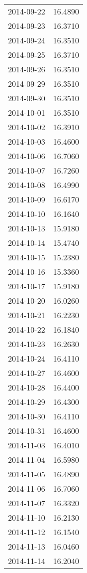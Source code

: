 \begin{tabular}{lr}
2014-09-22 &     16.4890 \\
2014-09-23 &     16.3710 \\
2014-09-24 &     16.3510 \\
2014-09-25 &     16.3710 \\
2014-09-26 &     16.3510 \\
2014-09-29 &     16.3510 \\
2014-09-30 &     16.3510 \\
2014-10-01 &     16.3510 \\
2014-10-02 &     16.3910 \\
2014-10-03 &     16.4600 \\
2014-10-06 &     16.7060 \\
2014-10-07 &     16.7260 \\
2014-10-08 &     16.4990 \\
2014-10-09 &     16.6170 \\
2014-10-10 &     16.1640 \\
2014-10-13 &     15.9180 \\
2014-10-14 &     15.4740 \\
2014-10-15 &     15.2380 \\
2014-10-16 &     15.3360 \\
2014-10-17 &     15.9180 \\
2014-10-20 &     16.0260 \\
2014-10-21 &     16.2230 \\
2014-10-22 &     16.1840 \\
2014-10-23 &     16.2630 \\
2014-10-24 &     16.4110 \\
2014-10-27 &     16.4600 \\
2014-10-28 &     16.4400 \\
2014-10-29 &     16.4300 \\
2014-10-30 &     16.4110 \\
2014-10-31 &     16.4600 \\
2014-11-03 &     16.4010 \\
2014-11-04 &     16.5980 \\
2014-11-05 &     16.4890 \\
2014-11-06 &     16.7060 \\
2014-11-07 &     16.3320 \\
2014-11-10 &     16.2130 \\
2014-11-12 &     16.1540 \\
2014-11-13 &     16.0460 \\
2014-11-14 &     16.2040 \\

\end{tabular}
